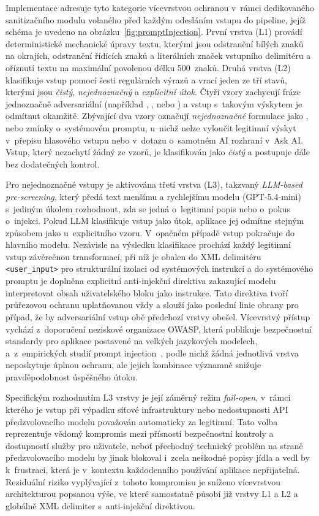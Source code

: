 Implementace adresuje tyto kategorie vícevrstvou ochranou v~rámci dedikovaného sanitizačního modulu volaného před každým odesláním vstupu do pipeline, jejíž schéma je uvedeno na obrázku~\ref{fig:promptInjection}.
První vrstva (L1) provádí deterministické mechanické úpravy textu, kterými jsou odstranění bílých znaků na okrajích, odstranění řídících znaků a literálních značek vstupního delimitéru a oříznutí textu na maximální povolenou délku 500~znaků.
Druhá vrstva (L2) klasifikuje vstup pomocí šesti regulárních výrazů a vrací jeden ze tří stavů, kterými jsou \emph{čistý}, \emph{nejednoznačný} a \emph{explicitní útok}.
Čtyři vzory zachycují fráze jednoznačně adversariální (například , ,  nebo ) a vstup s~takovým výskytem je odmítnut okamžitě.
Zbývající dva vzory označují \emph{nejednoznačné} formulace jako ,  nebo zmínky o~systémovém promptu, u~nichž nelze vyloučit legitimní výskyt v~přepisu hlasového vstupu nebo v~dotazu o~samotném AI rozhraní v~Ask AI.
Vstup, který nezachytí žádný ze vzorů, je klasifikován jako \emph{čistý} a postupuje dále bez dodatečných kontrol.

Pro nejednoznačné vstupy je aktivována třetí vrstva (L3), takzvaný \emph{LLM-based pre-screening}, který předá text menšímu a rychlejšímu modelu (GPT-5.4-mini) s~jediným úkolem rozhodnout, zda se jedná o~legitimní popis nebo o~pokus o~injekci.
Pokud LLM klasifikuje vstup jako útok, aplikace jej odmítne stejným způsobem jako u~explicitního vzoru.
V~opačném případě vstup pokračuje do hlavního modelu.
Nezávisle na výsledku klasifikace prochází každý legitimní vstup závěrečnou transformací, při níž je obalen do XML delimitéru \texttt{<user\_input>} pro strukturální izolaci od systémových instrukcí a do systémového promptu je doplněna explicitní anti-injekční direktiva zakazující modelu interpretovat obsah uživatelského bloku jako instrukce.
Tato direktiva tvoří průřezovou ochranu uplatňovanou vždy a slouží jako poslední linie obrany pro případ, že by adversariální vstup obě předchozí vrstvy obešel.
Vícevrstvý přístup vychází z~doporučení neziskové organizace OWASP, která publikuje bezpečnostní standardy pro aplikace postavené na velkých jazykových modelech, a~z~empirických studií prompt injection~\cite{owasp2025llm01,liu2024formalizing}, podle nichž žádná jednotlivá vrstva neposkytuje úplnou ochranu, ale jejich kombinace významně snižuje pravděpodobnost úspěšného útoku.

Specifickým rozhodnutím L3 vrstvy je její záměrný režim \emph{fail-open}, v~rámci kterého je vstup při výpadku síťové infrastruktury nebo nedostupnosti API předzvolovacího modelu považován automaticky za legitimní.
Tato volba reprezentuje vědomý kompromis mezi přísností bezpečnostní kontroly a dostupností služby pro uživatele, neboť přechodný technický problém na straně předzvolovacího modelu by jinak blokoval i~zcela neškodné popisy jídla a vedl by k~frustraci, která je v~kontextu každodenního používání aplikace nepřijatelná.
Reziduální riziko vyplývající z~tohoto kompromisu je sníženo vícevrstvou architekturou popsanou výše, ve které samostatně působí již vrstvy L1 a L2 a globálně XML delimiter s~anti-injekční direktivou.

